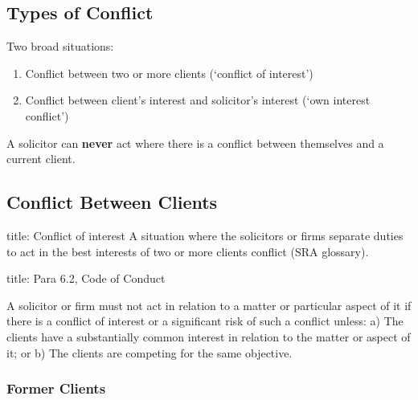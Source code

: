 \documentclass[
]{article}
\newenvironment{Shaded}{}{}
\newcommand{\NormalTok}[1]{#1}
\providecommand{\tightlist}{%
  \setlength{\itemsep}{0pt}\setlength{\parskip}{0pt}}
\begin{document}
\hypertarget{types-of-conflict}{%
\subsection{Types of Conflict}\label{types-of-conflict}}

Two broad situations:

\begin{enumerate}
\def\labelenumi{\arabic{enumi}.}
\tightlist
\item
  Conflict between two or more clients (`conflict of interest')
\item
  Conflict between client's interest and solicitor's interest (`own
  interest conflict')
\end{enumerate}

A solicitor can \textbf{never} act where there is a conflict between
themselves and a current client.

\hypertarget{conflict-between-clients}{%
\subsection{Conflict Between Clients}\label{conflict-between-clients}}

\begin{Shaded}
\begin{Highlighting}[]
\NormalTok{title: Conflict of interest}
\NormalTok{A situation where the solicitor\textquotesingle{}s or firm\textquotesingle{}s separate duties to act in the best interests of two or more clients conflict (SRA glossary).}
\end{Highlighting}
\end{Shaded}

\begin{Shaded}
\begin{Highlighting}[]
\NormalTok{title: Para 6.2, Code of Conduct}

\NormalTok{A solicitor or firm must not act in relation to a matter or particular aspect of it if there is a conflict of interest or a significant risk of such a conflict unless:}
\NormalTok{a) The clients have a substantially common interest in relation to the matter or aspect of it; or}
\NormalTok{b) The clients are competing for the same objective.}
\end{Highlighting}
\end{Shaded}

\hypertarget{former-clients}{%
\subsubsection{Former Clients}\label{former-clients}}
\end{document}
